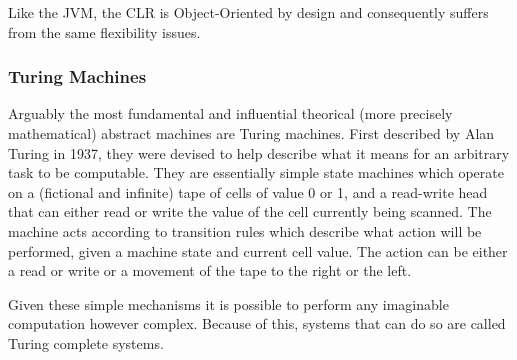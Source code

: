 Like the JVM, the CLR is Object-Oriented by design and consequently suffers from
the same flexibility issues.

\subsubsection{Turing Machines}

Arguably the most fundamental and influential theorical (more precisely
mathematical) abstract machines are Turing machines. First described by Alan
Turing in 1937\cite{sep-turing-machine}, they were devised to help describe what
it means for an arbitrary task to be computable. They are essentially simple
state machines which operate on a (fictional and infinite) tape of cells of
value 0 or 1, and a read-write head that can either read or write the value of
the cell currently being scanned\cite{sep-turing-machine}. The machine acts
according to transition rules which describe what action will be performed,
given a machine state and current cell value. The action can be either a read or
write or a movement of the tape to the right or the left.

Given these simple mechanisms it is possible to perform any imaginable
computation however complex. Because of this, systems that can do so are called
Turing complete systems.

